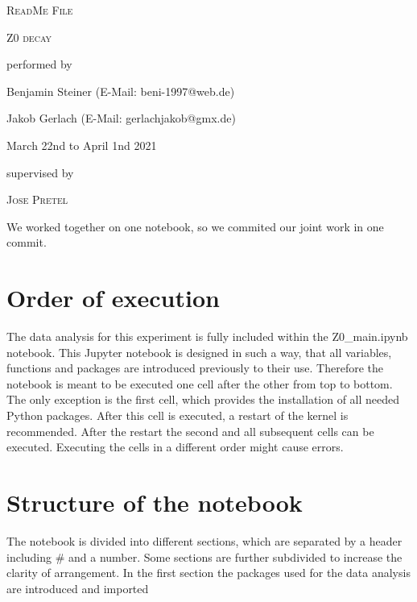 \documentclass[11pt,titlepage]{article}
\begin{document}
\begin{center}
	{\scshape\LARGE ReadMe File \par}
	\vspace{0.5cm}
	{\scshape\Large Z0 decay \par} 
	\vspace{1cm}
	
	\large{performed by} \par 
	\vspace{0.5cm}
	\large{Benjamin Steiner (E-Mail: beni-1997@web.de)} \par
	\large{Jakob Gerlach (E-Mail: gerlachjakob@gmx.de)} \par
	\vspace{0.5cm}
	\large{March 22nd to April 1nd 2021} \par
	\vspace{1cm}
	\large{supervised by}\par
	\vspace{0.5cm}
	\large 
	\textsc{Jose Pretel}\\
\end{center}

\vspace{2cm}
We worked together on one notebook, so we commited our joint work in one commit.
\vspace{0.5cm}

\section*{Order of execution}

The data analysis for this experiment is fully included within the Z0\_main.ipynb notebook. This Jupyter notebook is designed in such a way, that all variables, functions and packages are introduced previously to their use. Therefore the notebook is meant to be executed one cell after the other from top to bottom. The only exception is the first cell, which provides the installation of all needed Python packages. After this cell is executed, a restart of the kernel is recommended. After the restart the second and all subsequent cells can be executed. Executing the cells in a different order might cause errors.

 

\section*{Structure of the notebook}

The notebook is divided into different sections, which are separated by a header including \glqq \#\grqq{} and a number. Some sections are further subdivided to increase the clarity of arrangement. 
In the first section the packages used for the data analysis are introduced and imported
\end{document}
